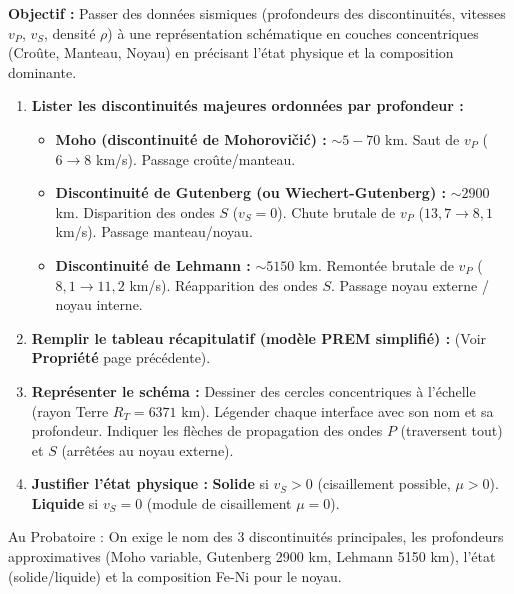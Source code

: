 \documentclass[11pt]{article}
\newcommand{\cle}[1]{{\popxbold\color{popdark}#1}}
\begin{document}
\begin{methode}
\textbf{Objectif :} Passer des données sismiques (profondeurs des discontinuités, vitesses $v_P$, $v_S$, densité $\rho$) à une représentation schématique en couches concentriques (Croûte, Manteau, Noyau) en précisant l'état physique et la composition dominante.
\begin{enumerate}
    \item \textbf{Lister les discontinuités majeures ordonnées par profondeur :}
    \begin{itemize}
        \item \textbf{Moho (discontinuité de Mohorovičić) :} $\sim 5-70$ km. Saut de $v_P$ ($6 \rightarrow 8$ km/s). Passage croûte/manteau.
        \item \textbf{Discontinuité de Gutenberg (ou Wiechert-Gutenberg) :} $\sim 2900$ km. Disparition des ondes $S$ ($v_S = 0$). Chute brutale de $v_P$ ($13,7 \rightarrow 8,1$ km/s). Passage manteau/noyau.
        \item \textbf{Discontinuité de Lehmann :} $\sim 5150$ km. Remontée brutale de $v_P$ ($8,1 \rightarrow 11,2$ km/s). Réapparition des ondes $S$. Passage noyau externe / noyau interne.
    \end{itemize}
    \item \textbf{Remplir le tableau récapitulatif (modèle PREM simplifié) :} (Voir \textbf{Propriété} page précédente).
    \item \textbf{Représenter le schéma :} Dessiner des cercles concentriques à l'échelle (rayon Terre $R_T = 6371$ km). Légender chaque interface avec son nom et sa profondeur. Indiquer les flèches de propagation des ondes $P$ (traversent tout) et $S$ (arrêtées au noyau externe).
    \item \textbf{Justifier l'état physique :} \textbf{Solide} si $v_S > 0$ (cisaillement possible, $\mu > 0$). \textbf{Liquide} si $v_S = 0$ (module de cisaillement $\mu = 0$).
\end{enumerate}
\cle{Au Probatoire :} On exige le nom des 3 discontinuités principales, les profondeurs approximatives (Moho variable, Gutenberg 2900 km, Lehmann 5150 km), l'état (solide/liquide) et la composition Fe-Ni pour le noyau.
\end{methode}
\end{document}
